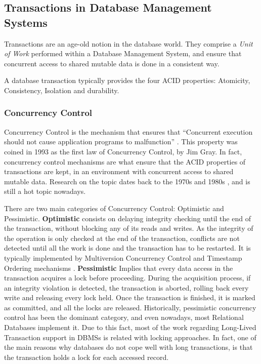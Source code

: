 \documentclass{llncs}
\begin{document}
\subsection{Transactions in Database Management Systems}
\label{sec:rdbms}

Transactions are an age-old notion in the database world. They
comprise a {\it Unit of Work} performed within a Database Management
System, and ensure that concurrent access to shared mutable data is
done in a consistent way.

A database transaction typically provides the four ACID properties:
Atomicity, Consistency, Isolation and durability.

\subsubsection{Concurrency Control}

Concurrency Control is the mechanism that ensures that ``Concurrent
execution should not cause application programs to malfunction''
\cite{reuter1993transaction}. This property was coined in 1993 as the
first law of Concurrency Control, by Jim Gray. In fact, concurrency
control mechanisms are what ensure that the ACID properties of
transactions are kept, in an environment with concurrent access to
shared mutable data. Research on the topic dates back to the 1970s
\cite{rosenkrantz1978system} and 1980s \cite{gray1981transaction}, and
is still a hot topic nowadays.

There are two main categories of Concurrency Control: Optimistic and
Pessimistic. {\bf Optimistic} consists on delaying integrity checking
until the end of the transaction, without blocking any of its reads
and writes. As the integrity of the operation is only checked at the
end of the transaction, conflicts are not detected until all the work
is done and the transaction has to be restarted. It is typically
implemented by Multiversion Concurrency Control and Timestamp Ordering
mechanisms \cite{Bernstein1981}. {\bf Pessimistic} Implies that every
data access in the transaction acquires a lock before
proceeding. During the acquisition process, if an integrity violation
is detected, the transaction is aborted, rolling back every write and
releasing every lock held. Once the transaction is finished, it is
marked as committed, and all the locks are released. Historically,
pessimistic concurrency control has been the dominant category, and
even nowadays, most Relational Databases implement it. Due to this
fact, most of the work regarding Long-Lived Transaction support in
DBMSs is related with locking approaches. In fact, one of the main
reasons why databases do not cope well with long transactions, is that
the transaction holds a lock for each accessed record.
\end{document}
